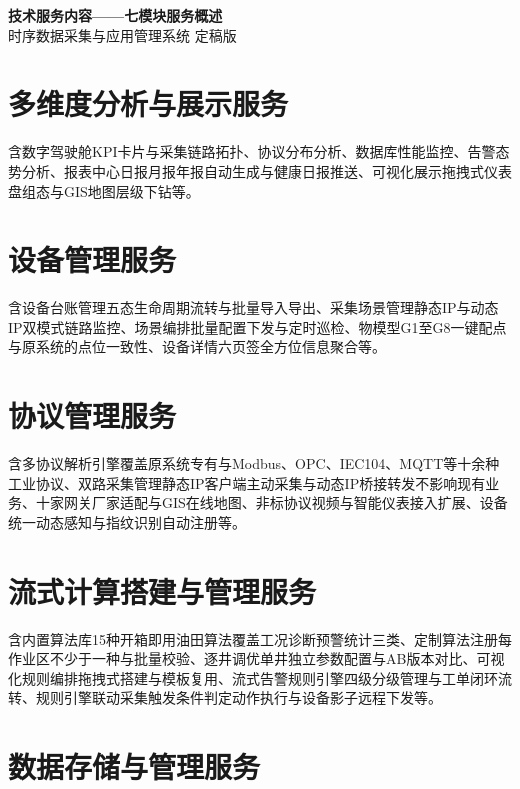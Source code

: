 \documentclass[11pt,a4paper]{ctexart}
\begin{document}
\begin{center}
{\Huge\bfseries\color{pri}技术服务内容——七模块服务概述}\\[6pt]
{\large 时序数据采集与应用管理系统  定稿版}
\end{center}
\vspace{1em}\hrulefill\vspace{1em}

\section{多维度分析与展示服务}

含数字驾驶舱KPI卡片与采集链路拓扑、协议分布分析、数据库性能监控、告警态势分析、报表中心日报月报年报自动生成与健康日报推送、可视化展示拖拽式仪表盘组态与GIS地图层级下钻等。

\section{设备管理服务}

含设备台账管理五态生命周期流转与批量导入导出、采集场景管理静态IP与动态IP双模式链路监控、场景编排批量配置下发与定时巡检、物模型G1至G8一键配点与原系统的点位一致性、设备详情六页签全方位信息聚合等。

\section{协议管理服务}

含多协议解析引擎覆盖原系统专有与Modbus、OPC、IEC104、MQTT等十余种工业协议、双路采集管理静态IP客户端主动采集与动态IP桥接转发不影响现有业务、十家网关厂家适配与GIS在线地图、非标协议视频与智能仪表接入扩展、设备统一动态感知与指纹识别自动注册等。

\section{流式计算搭建与管理服务}

含内置算法库15种开箱即用油田算法覆盖工况诊断预警统计三类、定制算法注册每作业区不少于一种与批量校验、逐井调优单井独立参数配置与AB版本对比、可视化规则编排拖拽式搭建与模板复用、流式告警规则引擎四级分级管理与工单闭环流转、规则引擎联动采集触发条件判定动作执行与设备影子远程下发等。

\section{数据存储与管理服务}
\end{document}
